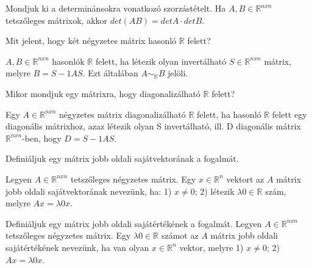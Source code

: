 \begin{frame}
  \begin{tcolorbox}[title={30}]
    Mondjuk ki a determinánsokra vonatkozó szorzástételt.
  \tcblower
    Ha $A,B \in \mathbb{R}^{n x n}$ tetszőleges mátrixok, akkor $det(AB) = detA  \cdot  detB$.
  \end{tcolorbox}
\end{frame}


\begin{frame}
  \begin{tcolorbox}[title={31}]
   Mit jelent, hogy két négyzetes mátrix hasonló $\mathbb{R}$ felett?

  \tcblower
    $A,B \in \mathbb{R}^{n x n}$ hasonlók $\mathbb{R}$ felett, ha létezik olyan invertálható $S \in \mathbb{R}^{n x n}$ mátrix, melyre $B = S-1AS$. Ezt általában $A {\sim}_{\mathbb{R}} B$ jelöli.

  \end{tcolorbox}
\end{frame}


\begin{frame}
  \begin{tcolorbox}[title={32}]
    Mikor mondjuk egy mátrixra, hogy diagonalizálható $\mathbb{R}$ felett?

  \tcblower
    Egy $A \in \mathbb{R}^{n x n}$ négyzetes mátrix diagonalizálható $\mathbb{R}$ felett, ha hasonló $\mathbb{R}$ felett egy diagonális mátrixhoz, azaz létezik olyan S invertálható, ill. D diagonális mátrix $\mathbb{R}^{n x n}$-ben, hogy $D = S-1AS$.

  \end{tcolorbox}
\end{frame}


\begin{frame}
  \begin{tcolorbox}[title={33}]
    Definiáljuk egy mátrix jobb oldali sajátvektorának a fogalmát.

  \tcblower
    Legyen $A \in \mathbb{R}^{n x n}$ tetszőleges négyzetes mátrix. Egy $x \in \mathbb{R}^n$ vektort az $A$ mátrix jobb oldali sajátvektorának nevezünk, ha: 1) $x \neq 0$; 2) létezik ${\lambda}0 \in \mathbb{R}$ szám, melyre $Ax = {\lambda}0x$.

  \end{tcolorbox}
\end{frame}


\begin{frame}
  \begin{tcolorbox}[title={34}]
   Definiáljuk egy mátrix jobb oldali sajátértékének a fogalmát.
  \tcblower
     Legyen $A \in \mathbb{R}^{n x n}$ tetszőleges négyzetes mátrix. Egy ${\lambda}0 \in \mathbb{R}$ számot az $A$ mátrix jobb oldali sajátértékének nevezünk, ha van olyan $x \in \mathbb{R}^n$ vektor, melyre 1) $x \neq 0$; 2) $Ax = {\lambda}0x$.

  \end{tcolorbox}
\end{frame}


